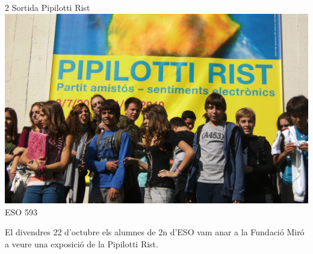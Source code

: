 \begin{news}
{2} %
{Sortida Pipilotti Rist}
{\noindent\includegraphics[width=16cm,keepaspectratio]{eso/img/pipilotib.JPG}}
{ESO}
{593} %

El divendres 22 d'octubre els alumnes de 2n d'ESO vam anar a la Fundació Miró a veure una exposició de la Pipilotti Rist.





\end{news}
